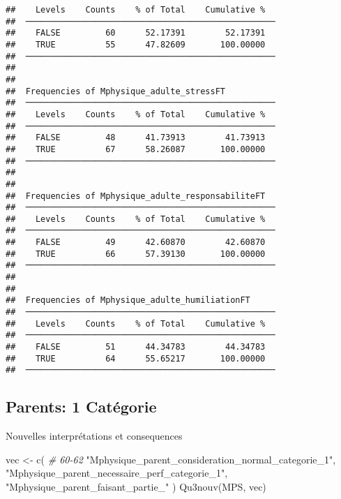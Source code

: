 \documentclass[
]{article}
\newenvironment{Shaded}{\begin{snugshade}}{\end{snugshade}}
\newcommand{\CommentTok}[1]{\textcolor[rgb]{0.56,0.35,0.01}{\textit{#1}}}
\newcommand{\FunctionTok}[1]{\textcolor[rgb]{0.00,0.00,0.00}{#1}}
\newcommand{\NormalTok}[1]{#1}
\newcommand{\OtherTok}[1]{\textcolor[rgb]{0.56,0.35,0.01}{#1}}
\newcommand{\StringTok}[1]{\textcolor[rgb]{0.31,0.60,0.02}{#1}}
\begin{document}
\begin{verbatim}
##    Levels    Counts    % of Total    Cumulative %   
##  ────────────────────────────────────────────────── 
##    FALSE         60      52.17391        52.17391   
##    TRUE          55      47.82609       100.00000   
##  ────────────────────────────────────────────────── 
## 
## 
##  Frequencies of Mphysique_adulte_stressFT           
##  ────────────────────────────────────────────────── 
##    Levels    Counts    % of Total    Cumulative %   
##  ────────────────────────────────────────────────── 
##    FALSE         48      41.73913        41.73913   
##    TRUE          67      58.26087       100.00000   
##  ────────────────────────────────────────────────── 
## 
## 
##  Frequencies of Mphysique_adulte_responsabiliteFT   
##  ────────────────────────────────────────────────── 
##    Levels    Counts    % of Total    Cumulative %   
##  ────────────────────────────────────────────────── 
##    FALSE         49      42.60870        42.60870   
##    TRUE          66      57.39130       100.00000   
##  ────────────────────────────────────────────────── 
## 
## 
##  Frequencies of Mphysique_adulte_humiliationFT      
##  ────────────────────────────────────────────────── 
##    Levels    Counts    % of Total    Cumulative %   
##  ────────────────────────────────────────────────── 
##    FALSE         51      44.34783        44.34783   
##    TRUE          64      55.65217       100.00000   
##  ──────────────────────────────────────────────────
\end{verbatim}

\hypertarget{parents-1-catuxe9gorie}{%
\subsection{Parents: 1 Catégorie}\label{parents-1-catuxe9gorie}}

Nouvelles interprétations et consequences

\begin{Shaded}
\begin{Highlighting}[]
\NormalTok{vec }\OtherTok{\textless{}{-}} \FunctionTok{c}\NormalTok{(         }\CommentTok{\# 60{-}62}
  \StringTok{"Mphysique\_parent\_consideration\_normal\_categorie\_1"}\NormalTok{,}
  \StringTok{"Mphysique\_parent\_necessaire\_perf\_categorie\_1"}\NormalTok{,}
  \StringTok{"Mphysique\_parent\_faisant\_partie\_"}
\NormalTok{)  }
\FunctionTok{Qu3nouv}\NormalTok{(MPS, vec)}
\end{Highlighting}
\end{Shaded}
\end{document}
